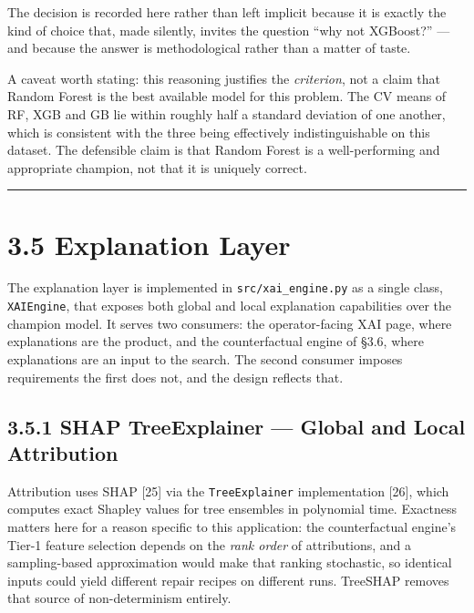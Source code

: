 The decision is recorded here rather than left implicit because it is exactly the kind of choice that, made silently, invites the question ``why not XGBoost?'' --- and because the answer is methodological rather than a matter of taste.

A caveat worth stating: this reasoning justifies the \emph{criterion}, not a claim that Random Forest is the best available model for this problem. The CV means of RF, XGB and GB lie within roughly half a standard deviation of one another, which is consistent with the three being effectively indistinguishable on this dataset. The defensible claim is that Random Forest is a well-performing and appropriate champion, not that it is uniquely correct.

\begin{center}\rule{0.5\linewidth}{0.5pt}\end{center}

\hypertarget{explanation-layer}{%
\section{3.5 Explanation Layer}\label{explanation-layer}}

The explanation layer is implemented in \texttt{src/xai\_engine.py} as a single class, \texttt{XAIEngine}, that exposes both global and local explanation capabilities over the champion model. It serves two consumers: the operator-facing XAI page, where explanations are the product, and the counterfactual engine of §3.6, where explanations are an input to the search. The second consumer imposes requirements the first does not, and the design reflects that.

\hypertarget{shap-treeexplainer-global-and-local-attribution}{%
\subsection{3.5.1 SHAP TreeExplainer --- Global and Local Attribution}\label{shap-treeexplainer-global-and-local-attribution}}

Attribution uses SHAP {[}25{]} via the \texttt{TreeExplainer} implementation {[}26{]}, which computes exact Shapley values for tree ensembles in polynomial time. Exactness matters here for a reason specific to this application: the counterfactual engine's Tier-1 feature selection depends on the \emph{rank order} of attributions, and a sampling-based approximation would make that ranking stochastic, so identical inputs could yield different repair recipes on different runs. TreeSHAP removes that source of non-determinism entirely.

